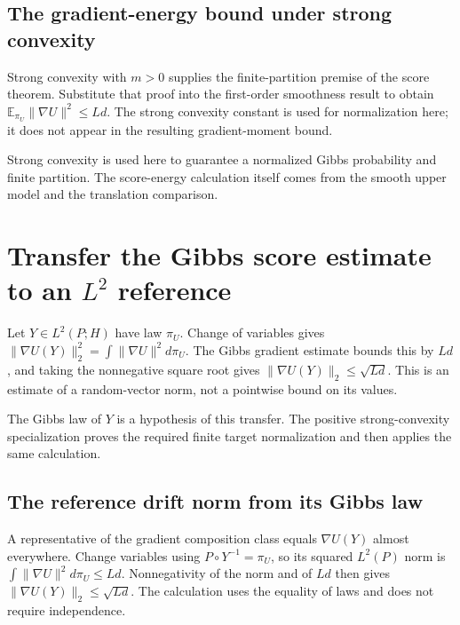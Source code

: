 \documentclass[11pt,a4paper]{report}
\begin{document}
\subsection{\texorpdfstring{The gradient-energy bound under strong convexity}{The gradient-energy bound under strong convexity}}
\label{report-step-UnadjustedLangevin-GibbsScore-lean-8}


Strong convexity with \(m>0\) supplies the finite-partition premise of the score theorem. Substitute that proof into the first-order smoothness result to obtain \(\mathbb E_{\pi_U}\|\nabla U\|^2\le Ld\). The strong convexity constant is used for normalization here; it does not appear in the resulting gradient-moment bound.



Strong convexity is used here to guarantee a normalized Gibbs probability and finite partition. The score-energy calculation itself comes from the smooth upper model and the translation comparison.

\section{\texorpdfstring{Transfer the Gibbs score estimate to an \(L^2\) reference}{Transfer the Gibbs score estimate to an L² reference}}
\label{proof-module-UnadjustedLangevin-StationaryMoments-lean}


Let \(Y\in L^2(P;H)\) have law \(\pi_U\). Change of variables gives \(\|\nabla U(Y)\|_2^2=\int\|\nabla U\|^2d\pi_U\). The Gibbs gradient estimate bounds this by \(Ld\), and taking the nonnegative square root gives \(\|\nabla U(Y)\|_2\le\sqrt{Ld}\). This is an estimate of a random-vector norm, not a pointwise bound on its values.



The Gibbs law of \(Y\) is a hypothesis of this transfer. The positive strong-convexity specialization proves the required finite target normalization and then applies the same calculation.

\subsection{\texorpdfstring{The reference drift norm from its Gibbs law}{The reference drift norm from its Gibbs law}}
\label{report-step-UnadjustedLangevin-StationaryMoments-lean-1}


A representative of the gradient composition class equals \(\nabla U(Y)\) almost everywhere. Change variables using \(P\circ Y^{-1}=\pi_U\), so its squared \(L^2(P)\) norm is \(\int\|\nabla U\|^2d\pi_U\le Ld\). Nonnegativity of the norm and of \(Ld\) then gives \(\|\nabla U(Y)\|_2\le\sqrt{Ld}\). The calculation uses the equality of laws and does not require independence.
\end{document}
